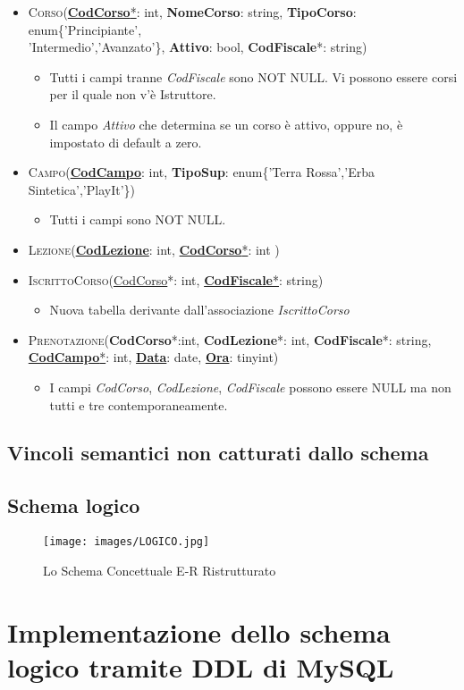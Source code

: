 \begin{itemize}
\item \textsc{Corso}(\underline{\textbf{CodCorso}*}: int, \textbf{NomeCorso}: string, \textbf{TipoCorso}: enum\{'Principiante',\\'Intermedio','Avanzato'\}, \textbf{Attivo}: bool, \textbf{CodFiscale}*: string)
\begin{itemize}
\item Tutti i campi tranne \textit{CodFiscale} sono NOT NULL. Vi possono essere corsi per il quale non v'è Istruttore.
\item Il campo \textit{Attivo} che determina se un corso è attivo, oppure no, è impostato di default a zero.
\end{itemize}
\item \textsc{Campo}(\underline{\textbf{CodCampo}}: int, \textbf{TipoSup}: enum\{'Terra Rossa','Erba Sintetica','PlayIt'\})
\begin{itemize}
\item Tutti i campi sono NOT NULL.
\end{itemize}

\item \textsc{Lezione}(\underline{\textbf{CodLezione}}: int, \underline{\textbf{CodCorso}*}: int )   
\item \textsc{IscrittoCorso}(\underline{CodCorso}*: int, \underline{\textbf{CodFiscale}*}: string) 
\begin{itemize}
\item Nuova tabella derivante dall'associazione \textit{IscrittoCorso}
\end{itemize}
\item \textsc{Prenotazione}(\textbf{CodCorso}*:int, \textbf{CodLezione}*: int, \textbf{CodFiscale}*: string, \underline{\textbf{CodCampo}*}: int, \underline{\textbf{Data}}: date, \underline{\textbf{Ora}}: tinyint)  
\begin{itemize}
\item I campi \textit{CodCorso}, \textit{CodLezione}, \textit{CodFiscale} possono essere NULL ma non tutti e tre contemporaneamente.
\end{itemize}
\end{itemize}

\section{Vincoli semantici non catturati dallo schema}
\section{Schema logico}
\begin{figure}[H]
 \centering
  \texttt{[image: images/LOGICO.jpg]}
\caption{Lo Schema Concettuale E-R Ristrutturato}
\end{figure}
\chapter{Implementazione dello schema logico tramite DDL di MySQL} 

